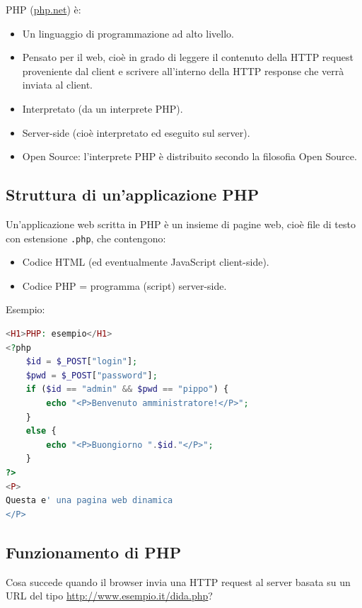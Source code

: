 PHP (\url{php.net}) è:

\begin{itemize}
    \item Un linguaggio di programmazione ad alto livello.
    \item Pensato per il web, cioè in grado di leggere il contenuto della HTTP request proveniente dal client e scrivere all'interno della HTTP response che verrà inviata al client.
    \item Interpretato (da un interprete PHP).
    \item Server-side (cioè interpretato ed eseguito sul server).
    \item Open Source: l'interprete PHP è distribuito secondo la filosofia Open Source.
\end{itemize}

\subsection{Struttura di un'applicazione PHP}

Un'applicazione web scritta in PHP è un insieme di pagine web, cioè file di testo con estensione \texttt{.php}, che contengono:

\begin{itemize}
    \item Codice HTML (ed eventualmente JavaScript client-side).
    \item Codice PHP = programma (script) server-side.
\end{itemize}

Esempio:

\begin{lstlisting}[language=PHP]
<H1>PHP: esempio</H1>
<?php
    $id = $_POST["login"];
    $pwd = $_POST["password"];
    if ($id == "admin" && $pwd == "pippo") {
        echo "<P>Benvenuto amministratore!</P>";
    }
    else {
        echo "<P>Buongiorno ".$id."</P>";
    }
?>
<P>
Questa e' una pagina web dinamica
</P>
\end{lstlisting}

\subsection{Funzionamento di PHP}

Cosa succede quando il browser invia una HTTP request al server basata su un URL del tipo \url{http://www.esempio.it/dida.php}?

